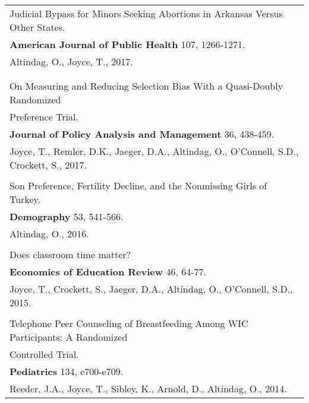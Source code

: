 \documentclass[12 pt]{article}
\begin{document}
\begin{longtable}{ccccc}
\\
   \multicolumn{5}{l}{Judicial Bypass for Minors Seeking Abortions in Arkansas Versus Other States.} \\
    \multicolumn{5}{l}{\textbf{American Journal of Public Health} 107, 1266-1271. 
} \\
    \multicolumn{5}{l}{Altindag, O., Joyce, T., 2017.}  \\
 
\\
\\
   \multicolumn{5}{l}{On Measuring and Reducing Selection Bias With a Quasi-Doubly Randomized} \\
      \multicolumn{5}{l}{Preference Trial.} \\
     \multicolumn{5}{l}{\textbf{Journal of Policy Analysis and Management} 36, 438-459. } \\
      \multicolumn{5}{l}{Joyce, T., Remler, D.K., Jaeger, D.A., Altindag, O., O'Connell, S.D., Crockett, S., 2017. } \\

 \\

   \multicolumn{5}{l}{Son Preference, Fertility Decline, and the Nonmissing Girls of Turkey.} \\
     \multicolumn{5}{l}{\textbf{Demography}  53, 541-566. } \\
      \multicolumn{5}{l}{Altindag, O., 2016. } \\

\\
   \multicolumn{5}{l}{Does classroom time matter?} \\
     \multicolumn{5}{l}{\textbf{Economics of Education Review} 46, 64-77. } \\
      \multicolumn{5}{l}{Joyce, T., Crockett, S., Jaeger, D.A., Altindag, O., O'Connell, S.D., 2015.} \\

 \\

   \multicolumn{5}{l}{Telephone Peer Counseling of Breastfeeding Among WIC Participants: A Randomized} \\
      \multicolumn{5}{l}{ Controlled Trial.} \\
     \multicolumn{5}{l}{\textbf{Pediatrics} 134, e700-e709. } \\
      \multicolumn{5}{l}{Reeder, J.A., Joyce, T., Sibley, K., Arnold, D., Altindag, O., 2014. } \\



\end{longtable}
\end{document}
